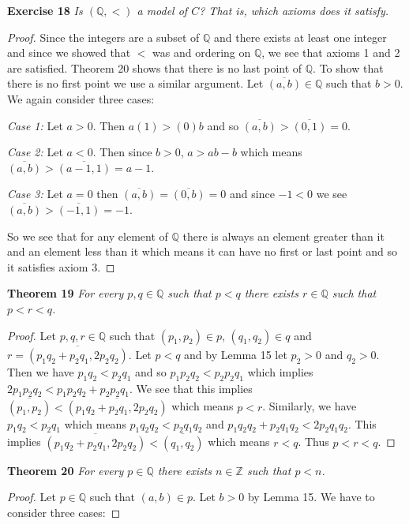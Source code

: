 \documentclass{article}
\begin{document}
\begin{flushleft}
\textbf{Exercise 18}
\textsl{Is $(\mathbb{Q},<)$ a model of $C$? That is, which axioms does it satisfy.}
\begin{proof}
Since the integers are a subset of $\mathbb{Q}$ and there exists at least one integer and since we showed that $<$ was and ordering on $\mathbb{Q}$, we see that axioms 1 and 2 are satisfied. Theorem 20 shows that there is no last point of $\mathbb{Q}$. To show that there is no first point we use a similar argument. Let $\overline{(a,b)} \in \mathbb{Q}$ such that $b>0$. We again consider three cases:\newline

\textsl{Case 1:} Let $a>0$. Then $a(1)>(0)b$ and so $\overline{(a,b)} > \overline{(0,1)} = 0$.\newline

\textsl{Case 2:} Let $a<0$. Then since $b>0$, $a>ab-b$ which means $\overline{(a,b)} > \overline{(a-1,1)} = a-1$.\newline

\textsl{Case 3:} Let $a=0$ then $\overline{(a,b)} = \overline{(0,b)} = 0$ and since $-1<0$ we see $\overline{(a,b)}>\overline{(-1,1)}=-1$.\newline

So we see that for any element of $\mathbb{Q}$ there is always an element greater than it and an element less than it which means it can have no first or last point and so it satisfies axiom 3.
\end{proof}

\textbf{Theorem 19}
\textsl{For every $p,q \in \mathbb{Q}$ such that $p<q$ there exists $r \in \mathbb{Q}$ such that $p<r<q$.}
\begin{proof}
Let $p,q,r \in \mathbb{Q}$ such that $(p_1,p_2) \in p$, $(q_1,q_2) \in q$ and $r = \overline{(p_1q_2+p_2q_1,2p_2q_2)}$. Let $p<q$ and by Lemma 15 let $p_2>0$ and $q_2>0$. Then we have $p_1q_2<p_2q_1$ and so $p_1p_2q_2<p_2p_2q_1$ which implies $2p_1p_2q_2<p_1p_2q_2+p_2p_2q_1$. We see that this implies $\overline{(p_1,p_2)} < \overline{(p_1q_2+p_2q_1,2p_2q_2)}$ which means $p<r$. Similarly, we have $p_1q_2<p_2q_1$ which means $p_1q_2q_2<p_2q_1q_2$ and $p_1q_2q_2+p_2q_1q_2<2p_2q_1q_2$. This implies $\overline{(p_1q_2+p_2q_1,2p_2q_2)}<\overline{(q_1,q_2)}$ which means $r<q$. Thus $p<r<q$.
\end{proof}

\textbf{Theorem 20}
\textsl{For every $p \in \mathbb{Q}$ there exists $n \in \mathbb{Z}$ such that $p<n$.}
\begin{proof}
Let $p \in \mathbb{Q}$ such that $(a,b) \in p$. Let $b>0$ by Lemma 15. We have to consider three cases:\newline


\end{proof}
\end{flushleft}
\end{document}
